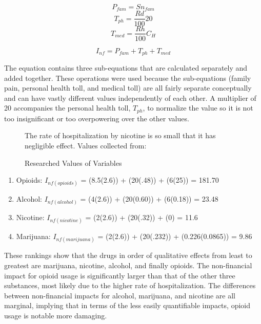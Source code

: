 \documentclass[12pt,letterpaper]{article}
\begin{document}
\begin{singlespace}
\begin{equation}
P_{fam} = S n_{fam}
\end{equation}
\begin{equation}
T_{ph} = \frac{Rd}{100} 20
\end{equation}
\begin{equation}
T_{med} = \frac{Rh}{100} C_H
\end{equation}

\begin{equation}
I_{nf} = P_{fam} + T_{ph} + T_{med}
\end{equation}
\end{singlespace}

The equation contains three sub-equations that are calculated separately and added together. These operations were used because the sub-equations (family pain, personal health toll, and medical toll) are all fairly separate conceptually and can have vastly different values independently of each other. A multiplier of 20 accompanies the personal health toll, $T_{ph}$, to normalize the value so it is not too insignificant or too overpowering over the other values.

\begin{figure}[H]
  \centering
  \caption{Researched Values of Variables}
  The rate of hospitalization by nicotine is so small that it has negligible effect.
  Values collected from: \citep{noauthor_alcoholism_nodate}\citep{noauthor_risky_2017}\citep{cdctobaccofree_tobacco_2019}\citep{noauthor_depression_nodate}\citep{stahre_alcohol-related_2010}\citep{zhu_trends_2016}\citep{noauthor_opioid_nodate}\citep{noauthor_publications_nodate}\citep{pacula_incremental_2008}\citep{noauthor_what_2018}
\end{figure}

\begin{enumerate}
  \item Opioids: $I_{nf (opioids)}$ = (8.5(2.6)) + (20(.48)) + (6(25)) = 181.70
  \item Alcohol: $I_{nf (alcohol)}$ = (4(2.6)) + (20(0.60)) + (6(0.18)) =  23.48
  \item Nicotine: $I_{nf (nicotine)}$ = (2(2.6)) + (20(.32)) + (0) = 11.6
  \item Marijuana: $I_{nf (marijuana)}$ = (2(2.6)) + (20(.232)) + (0.226(0.0865)) = 9.86
\end{enumerate}

These rankings show that the drugs in order of qualitative effects from least to greatest are marijuana, nicotine, alcohol, and finally opioids. The non-financial impact for opioid usage is significantly larger than that of the other three substances, most likely due to the higher rate of hospitalization. The differences between non-financial impacts for alcohol, marijuana, and nicotine are all marginal, implying that in terms of the less easily quantifiable impacts, opioid usage is notable more damaging.
\end{document}

